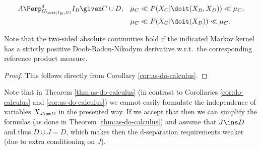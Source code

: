 \begin{Thm}
\begin{enumerate}
         \begin{align*} 
             A &\Perp^d_{G_{\doit(I_B,D)}} I_B \given C  \cup D, &          
             \mu_C &\ll P(X_C|\doit(X_B,X_{D})) \ll \mu_C, \\
                   && \mu_C &\ll P(X_C|\doit(X_{D})) \ll \mu_C.
         \end{align*}
    \end{enumerate}
 Note that the two-sided absolute continuities hold if the indicated Markov kernel has a strictly positive Doob-Radon-Nikodym derivative w.r.t.\ the corresponding reference product measure.
 \begin{proof}
     This follows directly from Corollary \ref{cor:as-do-calculus}.
 \end{proof}
\end{Thm}

\begin{Rem}
 Note that in Theorem \ref{thm:as-do-calculus} (in contrast to Corollaries \ref{cor:do-calculus} and \ref{cor:as-do-calculus}) we cannot easily formulate the independence of variables $X_{J \sm D}$ in the presented way. 
 If we accept that then we can simplify the formulas (as done in Theorem \ref{thm:as-do-calculus}) and assume that $J \ins D$ and thus $D \cup J = D$, which makes then the d-separation requirements weaker (due to extra conditioning on $J$).
\end{Rem}

